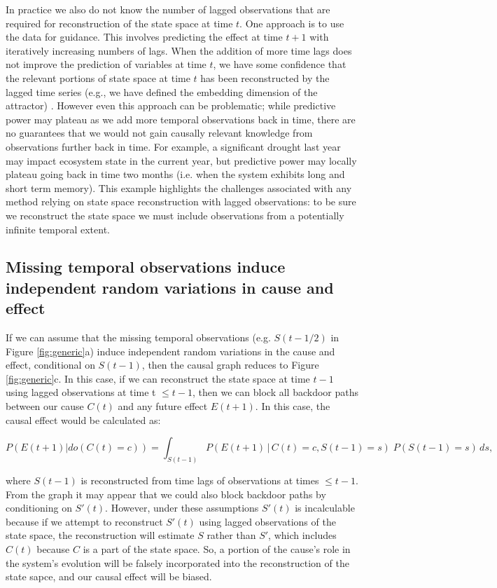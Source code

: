 \documentclass[12pt]{article}
\begin{document}
In practice we also do not know the number of lagged observations that
are required for reconstruction of the state space at time $t$. One
approach is to use the data for guidance. This involves predicting the
effect at time $t+1$ with iteratively increasing numbers of lags. When
the addition of more time lags does not improve the prediction of
variables at time $t$, we have some confidence that the relevant
portions of state space at time $t$ has been reconstructed by the
lagged time series (e.g., we have defined the embedding dimension of
the attractor) \citep{Sugihara496}. However even this approach can be
problematic; while predictive power may plateau as we add more
temporal observations back in time, there are no guarantees that we
would not gain causally relevant knowledge from observations further
back in time. For example, a significant drought last year may impact
ecosystem state in the current year, but predictive power may locally
plateau going back in time two months (i.e. when the system exhibits
long and short term memory). This example highlights the challenges
associated with any method relying on state space reconstruction with
lagged observations: to be sure we reconstruct the state space we must
include observations from a potentially infinite temporal extent.

\subsection{Missing temporal observations induce independent random
  variations in cause and effect}
\label{sec:miss-temp-observ}

If we can assume that the missing temporal observations
(e.g. $S(t-1/2)$ in Figure \ref{fig:generic}a) induce independent
random variations in the cause and effect, conditional on $S(t-1)$,
then the causal graph reduces to Figure \ref{fig:generic}c. In this
case, if we can reconstruct the state space at time $t-1$ using lagged
observations at time t $\leq t-1$, then we can block all backdoor
paths between our cause $C(t)$ and any future effect $E(t+1)$. In this
case, the causal effect would be calculated as:

\begin{equation}
  P(E(t+1)| do(C(t)=c)) = \int_{S(t-1)} P(E(t+1) \, | \, C(t)=c,
  S(t-1) = s
  )\; P(S(t-1)=s) \, d s,
\end{equation}

where $S(t-1)$ is reconstructed from time lags of observations at
times $\leq t-1$. From the graph it may appear that we could also
block backdoor paths by conditioning on $S'(t)$. However, under these
assumptions $S'(t)$ is incalculable because if we attempt to
reconstruct $S'(t)$ using lagged observations of the state space, the
reconstruction will estimate $S$ rather than $S'$, which includes
$C(t)$ because $C$ is a part of the state space. So, a portion of the
cause's role in the system's evolution will be falsely incorporated
into the reconstruction of the state sapce, and our causal effect will
be biased.
\end{document}
